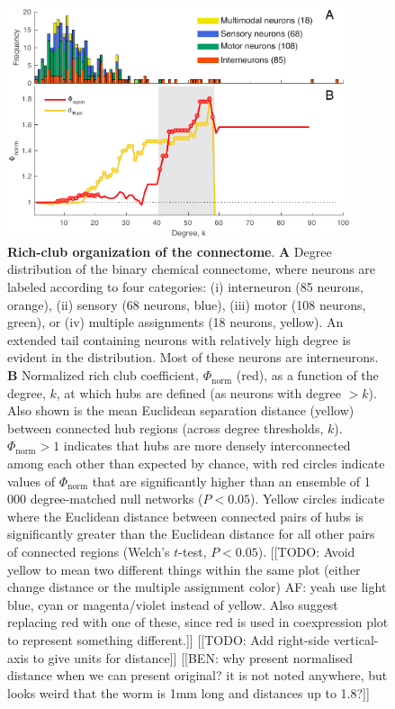 \documentclass[10pt,letterpaper]{article}
\begin{document}
\begin{figure}[h]
   \centering
    \includegraphics[width=0.9\textwidth]{topology_rich.pdf}
 \caption{\textbf{Rich-club organization of the connectome}.
\textbf{A} Degree distribution of the binary chemical connectome, where neurons are labeled according to four categories:
(i) interneuron (85 neurons, orange),
(ii) sensory (68 neurons, blue),
(iii) motor (108 neurons, green), or
(iv) multiple assignments (18 neurons, yellow).
An extended tail containing neurons with relatively high degree is evident in the distribution.
Most of these neurons are interneurons.
\textbf{B}
Normalized rich club coefficient, $\Phi_\mathrm{norm}$ (red), as a function of the degree, $k$, at which hubs are defined (as neurons with degree $>k$).
Also shown is the mean Euclidean separation distance (yellow) between connected hub regions (across degree thresholds, $k$).
$\Phi_\mathrm{norm} > 1$ indicates that hubs are more densely interconnected among each other than expected by chance, with red circles indicate values of $\Phi_\mathrm{norm}$ that are significantly higher than an ensemble of 1\,000 degree-matched null networks ($P < 0.05$).
Yellow circles indicate where the Euclidean distance between connected pairs of hubs is significantly greater than the Euclidean distance for all other pairs of connected regions (Welch's $t$-test, $P < 0.05$).
[[TODO: Avoid yellow to mean two different things within the same plot (either change distance or the multiple assignment color) AF: yeah use light blue, cyan or magenta/violet instead of yellow. Also suggest replacing red with one of these, since red is used in coexpression plot to represent something different.]]
[[TODO: Add right-side vertical-axis to give units for distance]]
[[BEN: why present normalised distance when we can present original? it is not noted anywhere, but looks weird that the worm is 1mm long and distances up to 1.8?]]
}
 \label{fig:topology_rich}
 \end{figure}
\end{document}
